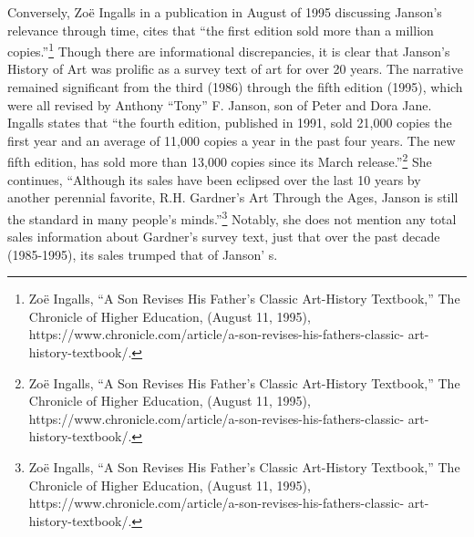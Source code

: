 \documentclass[
  letterpaper,
  DIV=11,
  numbers=noendperiod]{scrreprt}
\begin{document}
Conversely, Zoë Ingalls in a publication in August of 1995 discussing
Janson's relevance through time, cites that ``the first edition sold
more than a million copies.''\footnote{Zoë Ingalls, ``A Son Revises His
  Father's Classic Art-History Textbook,'' The Chronicle of Higher
  Education, (August 11, 1995),
  https://www.chronicle.com/article/a-son-revises-his-fathers-classic-
  art-history-textbook/.} Though there are informational discrepancies,
it is clear that Janson's History of Art was prolific as a survey text
of art for over 20 years. The narrative remained significant from the
third (1986) through the fifth edition (1995), which were all revised by
Anthony ``Tony'' F. Janson, son of Peter and Dora Jane. Ingalls states
that ``the fourth edition, published in 1991, sold 21,000 copies the
first year and an average of 11,000 copies a year in the past four
years. The new fifth edition, has sold more than 13,000 copies since its
March release.''\footnote{Zoë Ingalls, ``A Son Revises His Father's
  Classic Art-History Textbook,'' The Chronicle of Higher Education,
  (August 11, 1995),
  https://www.chronicle.com/article/a-son-revises-his-fathers-classic-
  art-history-textbook/.} She continues, ``Although its sales have been
eclipsed over the last 10 years by another perennial favorite, R.H.
Gardner's Art Through the Ages, Janson is still the standard in many
people's minds.''\footnote{Zoë Ingalls, ``A Son Revises His Father's
  Classic Art-History Textbook,'' The Chronicle of Higher Education,
  (August 11, 1995),
  https://www.chronicle.com/article/a-son-revises-his-fathers-classic-
  art-history-textbook/.} Notably, she does not mention any total sales
information about Gardner's survey text, just that over the past decade
(1985-1995), its sales trumped that of Janson' s.
\end{document}
